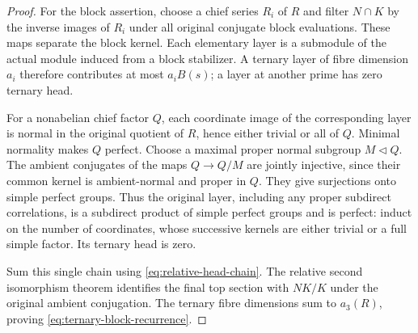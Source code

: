 \begin{proof}
For the block assertion, choose a chief series $R_i$ of $R$ and
filter $N\cap K$ by the inverse images of $R_i$ under all original
conjugate block evaluations. These maps separate the block kernel.
Each elementary layer is a submodule of the actual module induced
from a block stabilizer. A ternary layer of fibre dimension $a_i$
therefore contributes at most $a_iB(s)$; a layer at another prime
has zero ternary head.

For a nonabelian chief factor $Q$, each coordinate image of the
corresponding layer is normal in the original quotient of $R$,
hence either trivial or all of $Q$. Minimal normality makes $Q$
perfect. Choose a maximal proper normal subgroup $M\lhd Q$.
The ambient conjugates of the maps $Q\to Q/M$ are jointly injective,
since their common kernel is ambient-normal and proper in $Q$.
They give surjections onto simple perfect groups. Thus the original
layer, including any proper subdirect correlations, is a subdirect
product of simple perfect groups and is perfect: induct on the
number of coordinates, whose successive kernels are either trivial
or a full simple factor. Its ternary head is zero.

Sum this single chain using \eqref{eq:relative-head-chain}.
The relative second isomorphism theorem identifies the final top
section with $NK/K$ under the original ambient conjugation. The
ternary fibre dimensions sum to $a_3(R)$, proving
\eqref{eq:ternary-block-recurrence}.
\end{proof}

